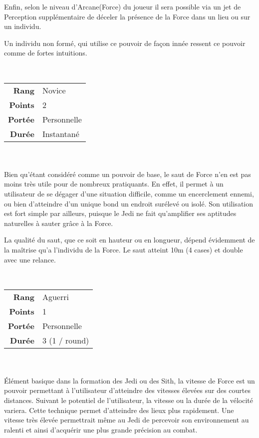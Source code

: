 \begin{description}[align=left]
        Enfin, selon le niveau d’Arcane(Force) du joueur il sera possible via un jet de Perception supplémentaire de déceler la présence de la Force dans un lieu ou sur un individu.

        Un individu non formé, qui utilise ce pouvoir de façon innée ressent ce pouvoir comme de fortes intuitions.
        \\  

    \newpage
    \item [Saut de Force] ~ \\

        \begin{tabular}{ r l }
            \textbf{Rang}    & Novice \\
            \textbf{Points}  & 2 \\
            \textbf{Portée}  & Personnelle \\
            \textbf{Durée}   & Instantané \\
        \end{tabular}
        \\ \\
        Bien qu’étant considéré comme un pouvoir de base, le saut de Force n’en est pas moins très utile pour de nombreux pratiquants. En effet, il permet à un utilisateur de se dégager d’une situation difficile, comme un encerclement ennemi, ou bien d’atteindre d’un unique bond un endroit surélevé ou isolé. Son utilisation est fort simple par ailleurs, puisque le Jedi ne fait qu’amplifier ses aptitudes naturelles à sauter grâce à la Force. 

        La qualité du saut, que ce soit en hauteur ou en longueur, dépend évidemment de la maîtrise qu’a l’individu de la Force. Le saut atteint 10m (4 cases) et double avec une relance.
        \\

    \item [Vitesse de Force] ~ \\

        \begin{tabular}{ r l }
            \textbf{Rang}    & Aguerri \\
            \textbf{Points}  & 1 \\
            \textbf{Portée}  & Personnelle \\
            \textbf{Durée}   & 3 (1 / round) \\
        \end{tabular}
        \\ \\
        \'Elément basique dans la formation des Jedi ou des Sith, la vitesse de Force est un pouvoir permettant à l’utilisateur d’atteindre des vitesses élevées sur des courtes distances. Suivant le potentiel de l’utilisateur, la vitesse ou la durée de la vélocité variera. Cette technique permet d’atteindre des lieux plus rapidement. Une vitesse très élevée permettrait même au Jedi de percevoir son environnement au ralenti et ainsi d’acquérir une plus grande précision au combat.


\end{description}
